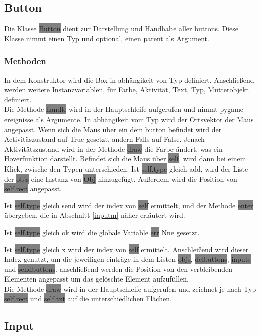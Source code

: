 \documentclass[12pt]{article}
\begin{document}
\subsection{Button}
Die Klasse \colorbox{gray}{Button} dient zur Darstellung und Handhabe aller buttons.
Diese Klasse nimmt einen Typ und optional, einen parent als Argument.
\subsubsection{Methoden}
In dem Konstruktor wird die Box in abhängikeit von Typ definiert.
Anschließend werden weitere Instanzvariablen, für Farbe, Aktivität, Text, Typ, Mutterobjekt definiert.
\\

Die Methode \colorbox{gray}{handle} wird in der Hauptschleife aufgerufen und nimmt pygame ereignisse als Argumente.
In abhängikeit vom Typ wird der Ortsvektor der Maus angepasst.
Wenn sich die Maus über ein dem button befindet wird der Activitäszustand auf True gesetzt, andern Falls auf False.
Jenach Aktivitätszustand wird in der Methode \colorbox{gray}{draw} die Farbe ändert, was ein Hoverfunktion darstellt.
Befindet sich die Maus über \colorbox{gray}{self}, wird dann bei einem Klick, zwische den Typen unterschieden.
Ist \colorbox{gray}{self.type} gleich add, wird der Liste der \colorbox{gray}{objs} eine Instanz von \colorbox{gray}{Obj} hinzugefügt.
Außerdem wird die Position von \colorbox{gray}{self.rect} angepasst.

Ist \colorbox{gray}{self.type} gleich send wird der index von \colorbox{gray}{self} ermittelt, und der Methode \colorbox{gray}{enter} übergeben, die in Abschnitt \ref{inputm} näher erläutert wird.

Ist \colorbox{gray}{self.type} gleich ok wird die globale Variable \colorbox{gray}{err} Nne gesetzt.

Ist \colorbox{gray}{self.type} gleich x wird der index von \colorbox{gray}{self} ermittelt.
Anschleißend wird dieser Index genutzt, um die jeweiligen einträge in dem Listen \colorbox{gray}{objs}, \colorbox{gray}{delbuttons}, \colorbox{gray}{inputs} und \colorbox{gray}{sendbuttons}.
anschließend werden die Position von den verbleibenden Elementen angepasst um das gelöschte Element aufzufüllen.
\\

Die Methode \colorbox{gray}{draw} wird in der Hauptschleife aufgerufen und zeichnet je nach Typ \colorbox{gray}{self.rect} und \colorbox{gray}{self.txt} auf die unterschiedlichen Flächen.
\subsection{Input}
\end{document}
